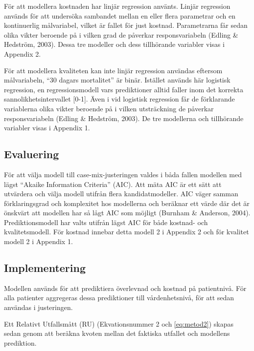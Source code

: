 För att modellera kostnaden har linjär regression använts. Linjär regression används för att undersöka sambandet mellan en eller flera parametrar och en kontinuerlig målvariabel, vilket är fallet för just kostnad. Parametrarna får sedan olika vikter beroende på i vilken grad de påverkar responsvariabeln (Edling \& Hedström, 2003). Dessa tre modeller och dess tillhörande variabler visas i Appendix 2.

För att modellera kvaliteten kan inte linjär regression användas eftersom målvariabeln, “30 dagars mortalitet” är binär. Istället används här logistisk regression, en regressionsmodell vars prediktioner alltid faller inom det korrekta sannolikhetsintervallet [0-1]. Även i vid logistisk regression får de förklarande variablerna olika vikter beroende på i vilken utsträckning de påverkar responsvariabeln (Edling \& Hedström, 2003). De tre modellerna och tillhörande variabler visas i Appendix 1. 

\subsection{Evaluering}

För att välja modell till case-mix-justeringen valdes i båda fallen modellen med lägst “Akaike Information Criteria” (AIC). Att mäta AIC är ett sätt att utvärdera och välja modell utifrån flera kandidatmodeller. AIC väger samman förklaringsgrad och komplexitet hos modellerna och beräknar ett värde där det är önskvärt att modellen har så lågt AIC som möjligt (Burnham \& Anderson, 2004). Prediktionsmodell har valts utifrån lägst AIC för både kostnad- och kvalitetsmodell. För kostnad innebar detta modell 2 i Appendix 2 och för kvalitet modell 2 i Appendix 1.

\subsection{Implementering}


Modellen används för att prediktiera överlevnad och kostnad på patientnivå. För alla patienter aggregeras dessa prediktioner till vårdenhetsnivå, för att sedan användas i justeringen. 

Ett Relativt Utfallsmått (RU) (Ekvationsnummer 2 och \ref{eq:metod2}) skapas sedan genom att beräkna kvoten mellan det faktiska utfallet och modellens prediktion.

